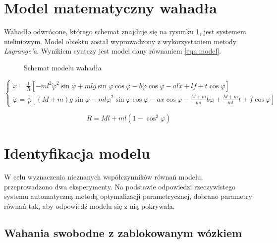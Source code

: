 \documentclass[12pt]{article}
\begin{document}


\section{Model matematyczny wahadła}

Wahadło odwrócone, którego schemat znajduje się na rysunku \ref{rys:smodel},
jest systemem nieliniowym. Model obiektu został wyprowadzony z wykorzystaniem
metody \textit{Lagrange'a}. Wynikiem syntezy jest model dany równaniem
\eqref{equ:model}.

\begin{figure}[!htb] 
  \begin{center}
    
    \caption{Schemat modelu wahadła}
    \label{rys:smodel} 
  \end{center}
\end{figure}

\begin{equation}
    \begin{cases}
    \ddot{x} = \frac{1}{R}\left[
    -ml^2\dot{\varphi}^2\sin{\varphi}
    +mlg\sin{\varphi}\cos{\varphi}
    -b\dot{\varphi}\cos{\varphi}
    -al\dot{x}
    +lf
    +t\cos{\varphi}\right] \\
    
    \ddot{\varphi} = \frac{1}{R}\left[
    (M+m)g\sin{\varphi}
    -ml\dot{\varphi}^2\sin{\varphi}\cos{\varphi}
    -a\dot{x}\cos{\varphi}
    -\frac{M+m}{ml}b\dot{\varphi}
    +\frac{M+m}{ml}t
    +f\cos{\varphi}\right]
    \end{cases}
    \label{equ:model}
\end{equation}

\begin{equation*}
    R = Ml + ml(1 - \cos^2{\varphi})
\end{equation*}

\newpage

\section{Identyfikacja modelu}

W celu wyznaczenia nieznanych współczynników równań modelu, przeprowadzono dwa
eksperymenty. Na podstawie odpowiedzi rzeczywistego systemu automatyczną metodą
optymalizacji parametrycznej, dobrano parametry równań tak, aby odpowiedź
modelu się z nią pokrywała.

\subsection{Wahania swobodne z zablokowanym wózkiem}
\end{document}
